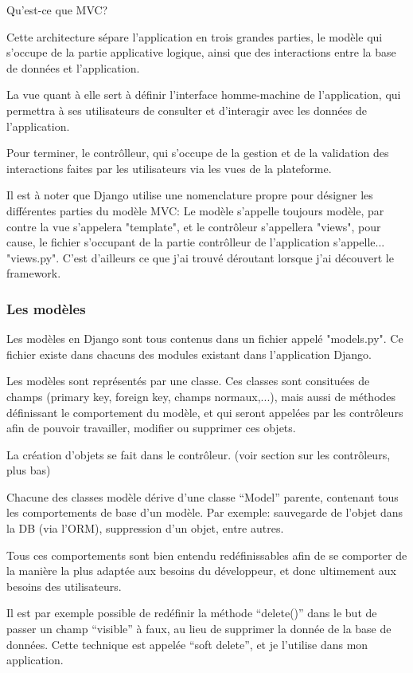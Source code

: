 \documentclass[12pt,table,a4paper]{report}
\begin{document}
Qu'est-ce que MVC?

Cette architecture sépare l'application en trois grandes parties, le modèle qui s'occupe de la partie applicative logique, ainsi que des interactions entre la base de données et l'application.

La vue quant à elle sert à définir l'interface homme-machine de l'application, qui permettra à ses utilisateurs de consulter et d'interagir avec les données de l'application.

Pour terminer, le contrôlleur, qui s'occupe de la gestion et de la validation des interactions faites par les utilisateurs via les vues de la plateforme.

Il est à noter que Django utilise une nomenclature propre pour désigner les différentes parties du modèle MVC: Le modèle s'appelle toujours modèle, par contre la vue s'appelera "template", et le contrôleur s'appellera "views", pour cause, le fichier s'occupant de la partie contrôlleur de l'application s'appelle... "views.py". C'est d'ailleurs ce que j'ai trouvé déroutant lorsque j'ai découvert le framework.

\subsubsection{Les modèles}
Les modèles en Django sont tous contenus dans un fichier appelé "models.py". Ce fichier existe dans chacuns des modules existant dans l'application Django.

Les modèles sont représentés par une classe. Ces classes sont consituées de champs (primary key, foreign key, champs normaux,...), mais aussi de méthodes définissant le comportement du modèle, et qui seront appelées par les contrôleurs afin de pouvoir travailler, modifier ou supprimer ces objets.

La création d'objets se fait dans le contrôleur. (voir section sur les contrôleurs, plus bas)

Chacune des classes modèle dérive d'une classe "`Model"' parente, contenant tous les comportements de base d'un modèle. Par exemple: sauvegarde de l'objet dans la DB (via l'ORM), suppression d'un objet, entre autres.

Tous ces comportements sont bien entendu redéfinissables afin de se comporter de la manière la plus adaptée aux besoins du développeur, et donc ultimement aux besoins des utilisateurs.

Il est par exemple possible de redéfinir la méthode "`delete()"' dans le but de passer un champ "`visible"' à faux, au lieu de supprimer la donnée de la base de données. Cette technique est appelée "`soft delete"', et je l'utilise dans mon application.
\end{document}

